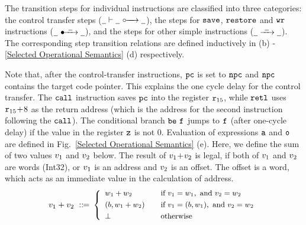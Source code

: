%				
%				
%				
%				

The transition steps for individual instructions are classified into
three categories: the control transfer steps
(${\underline{\ \,}} \vdash {\underline{\ \,}} \ \circ\mkern-7mu\xrightarrow{\quad} {\underline{\ \,}}$),
the steps for
$\texttt{save}$, $\texttt{restore}$ and $\texttt{wr}$ instructions
($\swtrans{\notCare}{\ \notCare\ }{\notCare}$),
and the steps
for other simple instructions
(${\underline{\ \,}} \xrightarrow{{\ \underline{\ \,}\ }} {\underline{\ \,}}$). The
corresponding step transition relations are defined inductively
in \Fig{\ref{Selected Operational Semantics}}
(b) - \ref{Selected Operational Semantics} (d)
respectively.

Note that, after the control-transfer instructions, $\texttt{pc}$ is set
to $\texttt{npc}$ and $\texttt{npc}$ contains the target code pointer. This explains
the one cycle delay for the control transfer.
The $\texttt{call}$ instruction saves $\texttt{pc}$ into the register $\texttt{r}_{15}$,
while $\texttt{retl}$ uses $\texttt{r}_{15} \!+\! 8$ as the
return address (which is the address for the second instruction
following the $\texttt{call}$).
The conditional branch $\texttt{be}{} \ \texttt{f}_{}$ jumps to $\texttt{f}_{}$ 
(after one-cycle delay) if 
the value in the register $\texttt{z}$ is not 0.
Evaluation of
expressions $\texttt{a}$ and $\texttt{o}$ are defined
in Fig.~\ref{Selected Operational Semantics} (e).
Here, we define the sum of two values $v_1$
and $v_2$ below. The result of $v_1\!+\!v_2$
is legal, if both of $v_1$ and $v_2$
are words (Int32), or $v_1$ is an address and
$v_2$ is an offset. The offset is a word,
which acts as an immediate value in the
calculation of address.
\[
	\small
	v_1 + v_2 \ ::\!\!{=} \
	\left\{
		\begin{array}{ll}
			w_1 + w_2 & \quad \text{if} \
				v_1 = w_1, \text{ and }
				v_2 = w_2 \\
			\\[-8pt]
			(b, w_1 + w_2) & \quad
				\text{if} \
				v_1 = (b, w_1),
				\text{ and }
				v_2 = w_2 \\
			\\[-8pt]
			\perp & \quad \text{otherwise}
		\end{array}
	\right.
\]


